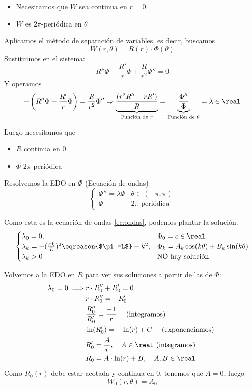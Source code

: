 		\begin{itemize}
			\item Necesitamos que $W$ sea continua en $r=0$
			\item $W$ es $2\pi$-periódica en $\theta$
		\end{itemize}

		\noindent Aplicamos el método de separación de variables, es decir, buscamos $$W(r, \theta) = R(r)\cdot \Phi(\theta)$$
		Sustituimos en el sistema:
		\[R''\Phi + \frac{R'}{r}\Phi + \frac{R}{r^2} \Phi'' = 0 \]
		Y operamos
		\[ - \left( R'' \Phi + \frac{R'}{r}\Phi \right) = \frac{R}{r^2} \Phi'' \Rightarrow \underbrace{\frac{(r^2R''+rR')}{R}}_{\text{Función de }r} = \underbrace{\frac{\Phi''}{\Phi}}_{\text{Función de }\theta} = \lambda \in \real \]

		Luego necesitamos que
		\begin{itemize}
			\item $R$ continua en 0
			\item $\Phi$ $2\pi$-periódica
		\end{itemize}


		Resolvemos la EDO en $\Phi$ (Ecuación de ondas)
		\[
			\begin{cases}
				\Phi'' = \lambda \Phi & \theta \in (-\pi, \pi) \\
				\Phi & 2\pi \text{ periódica }
			\end{cases}
		\]

		Como esta es la ecuación de ondas \ref{ec:ondas}, podemos plantar la solución:
		\[
			\begin{cases}
				\lambda_0 = 0,& \Phi_0 = c \in \real\\
				\lambda_k = -(\frac{\pi k}{L})^2 \eqreason{$\pi=L$} -k^2, & \Phi_k = A_k \cos (k\theta) + B_k \sin (k\theta)\\
				\lambda_k > 0 & \text{NO hay solución}
			\end{cases}
		\]

		Volvemos a la EDO en $R$ para ver sus soluciones a partir de las de $\Phi$:
		\begin{align*}
			\lambda_0 = 0 \implies & r\cdot R_0'' + R'_0 = 0\\
			& r\cdot R_0'' = - R'_0\\
			& \frac{R''_0}{R'_0} = \frac{-1}{r} \quad \text{ (integramos) }\\
			& \ln(R'_0) = - \ln(r) + C \quad \text{ (exponenciamos) }\\
			& R'_0 = \frac{A}{r}, \quad A \in \real \text{ (integramos) }\\
			& R_0 = A \cdot \ln(r) + B, \quad A,B \in \real
		\end{align*}
		Como $R_0(r)$ debe estar acotada y continua en 0, tenemos que $A = 0$, luego $$W_{0}(r, \theta) = A_0$$

